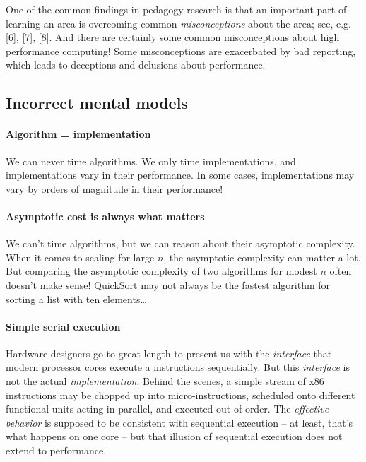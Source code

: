 \documentclass[12pt, leqno]{article} %
\begin{document}
One of the common findings in pedagogy research is that an important
part of learning an area is overcoming common \emph{misconceptions}
about the area; see, e.g.
\href{http://www.lifescied.org/content/13/2/179.abstract}{{[}6{]}},
\href{http://aer.sagepub.com/content/50/5/1020}{{[}7{]}},
\href{http://sydney.edu.au/science/physics/pdfs/research/super/PhD(Muller).pdf}{{[}8{]}}.
And there are certainly some common misconceptions about high
performance computing! Some misconceptions are exacerbated by bad
reporting, which leads to deceptions and delusions about performance.

\subsection{Incorrect mental models}

\paragraph{Algorithm = implementation}

We can never time algorithms. We only time implementations, and
implementations vary in their performance. In some cases,
implementations may vary by orders of magnitude in their performance!

\paragraph{Asymptotic cost is always what matters}

We can't time algorithms, but we can reason about their asymptotic
complexity. When it comes to scaling for large $n$, the asymptotic
complexity can matter a lot. But comparing the asymptotic complexity of
two algorithms for modest $n$ often doesn't make sense! QuickSort may
not always be the fastest algorithm for sorting a list with ten
elements\ldots{}

\paragraph{Simple serial execution}

Hardware designers go to great length to present us with the
\emph{interface} that modern processor cores execute a instructions
sequentially. But this \emph{interface} is not the actual
\emph{implementation}. Behind the scenes, a simple stream of x86
instructions may be chopped up into micro-instructions, scheduled onto
different functional units acting in parallel, and executed out of
order. The \emph{effective behavior} is supposed to be consistent with
sequential execution -- at least, that's what happens on one core -- but
that illusion of sequential execution does not extend to performance.
\end{document}
